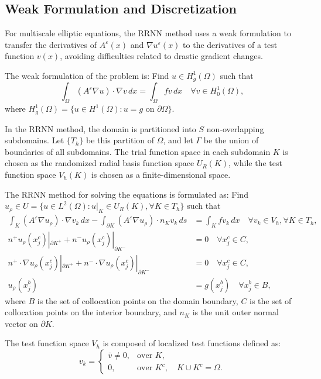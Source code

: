 \documentclass[11pt]{article}
\begin{document}
\subsection{Weak Formulation and Discretization}

For multiscale elliptic equations, the RRNN method uses a weak formulation to transfer the derivatives of $A^{\varepsilon}(x)$ and $\nabla u^{\varepsilon}(x)$ to the derivatives of a test function $v(x)$, avoiding difficulties related to drastic gradient changes.

The weak formulation of the problem is: Find $u \in H_g^1(\Omega)$ such that
\begin{equation}
\int_{\Omega} (A^{\varepsilon} \nabla u) \cdot \nabla v \, dx = \int_{\Omega} f v \, dx \quad \forall v \in H_0^1(\Omega),
\end{equation}
where $H_g^1(\Omega) = \{u \in H^1(\Omega) : u = g \text{ on } \partial\Omega\}$.

In the RRNN method, the domain is partitioned into $S$ non-overlapping subdomains. Let $\{T_h\}$ be this partition of $\Omega$, and let $\Gamma$ be the union of boundaries of all subdomains. The trial function space in each subdomain $K$ is chosen as the randomized radial basis function space $U_R(K)$, while the test function space $V_h(K)$ is chosen as a finite-dimensional space.

The RRNN method for solving the equations is formulated as: Find $u_{\rho} \in U = \{u \in L^2(\Omega) : u|_K \in U_R(K), \forall K \in T_h\}$ such that
\begin{align}
\int_K (A^{\varepsilon} \nabla u_{\rho}) \cdot \nabla v_k \, dx - \int_{\partial K} (A^{\varepsilon} \nabla u_{\rho}) \cdot n_K v_k \, ds &= \int_K f v_k \, dx \quad \forall v_k \in V_h, \forall K \in T_h, \\
n^+ u_{\rho}(x_j^c)|_{\partial K^+} + n^- u_{\rho}(x_j^c)|_{\partial K^-} &= 0 \quad \forall x_j^c \in C, \\
n^+ \cdot \nabla u_{\rho}(x_j^c)|_{\partial K^+} + n^- \cdot \nabla u_{\rho}(x_j^c)|_{\partial K^-} &= 0 \quad \forall x_j^c \in C, \\
u_{\rho}(x_j^b) &= g(x_j^b) \quad \forall x_j^b \in B,
\end{align}
where $B$ is the set of collocation points on the domain boundary, $C$ is the set of collocation points on the interior boundary, and $n_K$ is the unit outer normal vector on $\partial K$.

The test function space $V_h$ is composed of localized test functions defined as:
\begin{equation}
v_k = 
\begin{cases}
\bar{v} \neq 0, & \text{over } K, \\
0, & \text{over } K^c, \quad K \cup K^c = \Omega.
\end{cases}
\end{equation}
\end{document}
